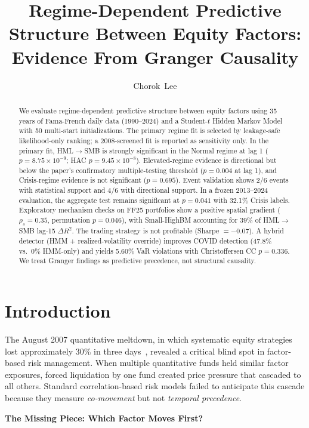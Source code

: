 \documentclass{uai2026}
\title{Regime-Dependent Predictive Structure Between Equity Factors: Evidence From Granger Causality}
\author[1]{Chorok~Lee}
\affil[1]{Korea Advanced Institute of Science and Technology (KAIST)\\
  Daejeon, Republic of Korea}
\begin{document}
\maketitle
\begin{abstract}
We evaluate regime-dependent predictive structure between equity factors using
35 years of Fama-French daily data (1990--2024) and a Student-$t$ Hidden
Markov Model with 50 multi-start initializations. The primary regime fit is
selected by leakage-safe likelihood-only ranking; a 2008-screened fit is
reported as sensitivity only. In the primary fit, HML$\to$SMB is strongly
significant in the Normal regime at lag 1 ($p = 8.75 \times 10^{-9}$;
HAC $p = 9.45 \times 10^{-8}$). Elevated-regime evidence is directional but
below the paper's confirmatory multiple-testing threshold
($p = 0.004$ at lag 1), and Crisis-regime evidence is not significant
($p = 0.695$). Event validation shows 2/6 events with statistical support and
4/6 with directional support. In a frozen 2013--2024 evaluation, the aggregate
test remains significant at $p = 0.041$ with 32.1\% Crisis labels.
Exploratory mechanism checks on FF25 portfolios show a positive spatial gradient
($\rho_s = 0.35$, permutation $p = 0.046$), with Small-HighBM accounting for
39\% of HML$\to$SMB lag-15 $\Delta R^2$. The trading strategy is not profitable
(Sharpe $=-0.07$). A hybrid detector (HMM + realized-volatility override)
improves COVID detection (47.8\% vs.\ 0\% HMM-only) and yields 5.60\% VaR
violations with Christoffersen CC $p = 0.336$. We treat Granger findings as
predictive precedence, not structural causality.
\end{abstract}



\section{Introduction}

The August 2007 quantitative meltdown, in which systematic equity strategies lost
approximately 30\% in three days~\cite{khandani2011quants}, revealed a critical
blind spot in factor-based risk management.
When multiple quantitative funds held similar factor exposures, forced liquidation
by one fund created price pressure that cascaded to all others.
Standard correlation-based risk models failed to anticipate this cascade because they
measure \emph{co-movement} but not \emph{temporal precedence}.

\textbf{The Missing Piece: Which Factor Moves First?}
\end{document}

